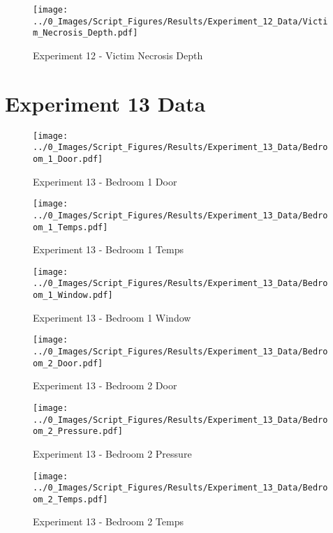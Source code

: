 	\begin{figure}[H]
		\centering
		\texttt{[image: ../0\_Images/Script\_Figures/Results/Experiment\_12\_Data/Victim\_Necrosis\_Depth.pdf]}
		\caption[]{Experiment 12 - Victim Necrosis Depth}
	\end{figure}
 
	\clearpage

\clearpage		\large
\section{Experiment 13 Data} \label{App:Exp13Results} 

	\begin{figure}[H]
		\centering
		\texttt{[image: ../0\_Images/Script\_Figures/Results/Experiment\_13\_Data/Bedroom\_1\_Door.pdf]}
		\caption[]{Experiment 13 - Bedroom 1 Door}
	\end{figure}
 

	\begin{figure}[H]
		\centering
		\texttt{[image: ../0\_Images/Script\_Figures/Results/Experiment\_13\_Data/Bedroom\_1\_Temps.pdf]}
		\caption[]{Experiment 13 - Bedroom 1 Temps}
	\end{figure}
 
	\clearpage

	\begin{figure}[H]
		\centering
		\texttt{[image: ../0\_Images/Script\_Figures/Results/Experiment\_13\_Data/Bedroom\_1\_Window.pdf]}
		\caption[]{Experiment 13 - Bedroom 1 Window}
	\end{figure}
 

	\begin{figure}[H]
		\centering
		\texttt{[image: ../0\_Images/Script\_Figures/Results/Experiment\_13\_Data/Bedroom\_2\_Door.pdf]}
		\caption[]{Experiment 13 - Bedroom 2 Door}
	\end{figure}
 
	\clearpage

	\begin{figure}[H]
		\centering
		\texttt{[image: ../0\_Images/Script\_Figures/Results/Experiment\_13\_Data/Bedroom\_2\_Pressure.pdf]}
		\caption[]{Experiment 13 - Bedroom 2 Pressure}
	\end{figure}
 

	\begin{figure}[H]
		\centering
		\texttt{[image: ../0\_Images/Script\_Figures/Results/Experiment\_13\_Data/Bedroom\_2\_Temps.pdf]}
		\caption[]{Experiment 13 - Bedroom 2 Temps}
	\end{figure}
 
